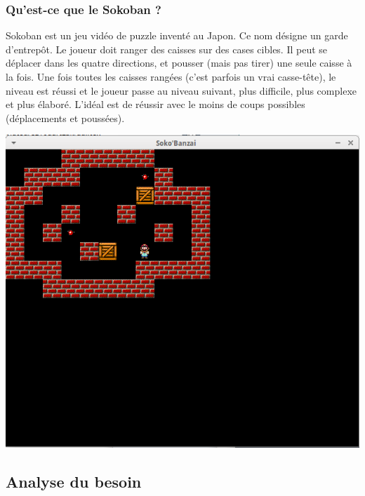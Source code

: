 \documentclass[a4paper,12pt]{article} %
\begin{document}
\subsubsection{Qu'est-ce que le Sokoban ?}
Sokoban est un jeu vidéo de puzzle inventé au Japon.
Ce nom désigne un garde d'entrepôt.
Le joueur doit ranger des caisses sur des cases cibles.
Il peut se déplacer dans les quatre directions, et pousser (mais pas tirer) une seule caisse à la fois.
Une fois toutes les caisses rangées (c'est parfois un vrai casse-tête), le niveau est réussi et le joueur passe au niveau suivant, plus difficile, plus complexe et plus élaboré.
L'idéal est de réussir avec le moins de coups possibles (déplacements et poussées).
\newline\newline\newline
\begin{center} \includegraphics[scale=1]{sokobanzai.png} \end{center}
\newpage





\subsection{Analyse du besoin}
\end{document}
